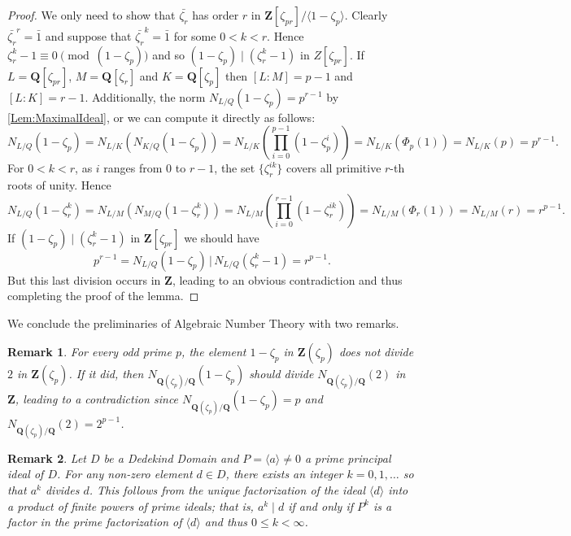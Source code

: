 \documentclass[a4paper,12pt,reqno]{amsart}
\newtheorem{remark}{Remark}
\def\Z{\mathbf{Z}}
\def\Q{\mathbf{Q}}
\begin{document}
\begin{proof}
We only need to show that $\bar{\zeta_r}$ has order $r$ in $\Z[\zeta_{pr}]/\langle 1- \zeta_p \rangle$.
Clearly $\bar{\zeta_r}^r= \bar{1}$  and suppose that 
$\bar{\zeta_r}^k= \bar{1}$ for some $0 < k < r$. 
Hence $\zeta_r^k-1 \equiv 0 \pmod{(1- \zeta_p)}$  and so 
$(1- \zeta_p) \mid (\zeta_r^k-1)$ in $Z[\zeta_{pr}]$.
If $L = \Q[\zeta_{pr}]$, $M= \Q[\zeta_r]$ and $K= \Q[\zeta_p]$ then $[L:M]= p-1$ and  $[L:K]= r-1$. Additionally, the norm \( N_{L/Q}(1- \zeta_p) = p^{r-1} \) by  \autoref{Lem:MaximalIdeal}, or we can compute it directly as follows:
\[
N_{L/Q}(1- \zeta_p) = N_{L/K}(N_{K/Q}(1 - \zeta_p)) = N_{L/K}\left(\prod_{i=0}^{p-1} (1-\zeta_p^i)\right) = N_{L/K}(\Phi_p(1)) = N_{L/K}(p) = p^{r-1}. 
\]
For $0 < k < r$, as $i$ ranges from $0$ to $r-1$, the set $\{ \zeta_r^{ik} \}$ covers all primitive $r$-th roots of unity. Hence 
\[N_{L/Q}(1- \zeta_r^k)= N_{L/M}(N_{M/Q}(1 - \zeta_r^k))=N_{L/M}\left(\prod_{i=0}^{r-1} (1-\zeta_r^{ik})\right)=
N_{L/M}(\Phi_r(1))= N_{L/M}(r)=r^{p-1}. 
\]
If $(1 - \zeta_p) \mid (\zeta_r^k - 1)$ in $\Z[\zeta_{pr}]$  we should have 
\[
p^{r-1}= N_{L/Q} (1-\zeta_p) \, \big| \,  N_{L/Q}(\zeta_r^k-1)= r^{p-1}.
\]
But this last division occurs in $\Z$, leading to an obvious contradiction and thus completing the proof of the lemma.
\end{proof}

We conclude the preliminaries of Algebraic Number Theory with two remarks.
\begin{remark}\label{remark1}
 For every odd prime $p$, the element $1 - \zeta_p$ in $\Z(\zeta_p)$ does not divide $2$ in $\Z(\zeta_p)$. If it did, then $N_{\Q(\zeta_p)/\Q}(1 - \zeta_p)$ should divide $N_{\Q(\zeta_p)/\Q}(2)$ in $\Z$, leading to a contradiction since $N_{\Q(\zeta_p)/\Q}(1 - \zeta_p) = p$ and $N_{\Q(\zeta_p)/\Q}(2) = 2^{p-1}$.
\end{remark}


\begin{remark}\label{remark2}
Let $D$ be a Dedekind Domain and $P = \langle a \rangle \neq 0$ a prime principal ideal of $D$. For any non-zero element $d \in D$, there exists an integer $k = 0,1, \ldots $ so that $a^k$ divides $d$. This follows from the unique factorization of the ideal $\langle d \rangle$ into a product of finite powers of prime ideals; that is, $a^k \mid d$ if and only if $P^k$ is a factor in the prime factorization of $\langle d \rangle$ and thus $0 \leq k < \infty$. 
\end{remark}
\end{document}

